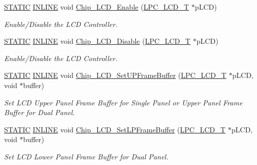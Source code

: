 \begin{DoxyCompactItemize}
\hyperlink{group___l_p_c___types___public___macros_ga10b2d890d871e1489bb02b7e70d9bdfb}{S\+T\+A\+T\+IC} \hyperlink{spifi__18xx__43xx_8h_a2eb6f9e0395b47b8d5e3eeae4fe0c116}{I\+N\+L\+I\+NE} void \hyperlink{group___l_c_d__18_x_x__43_x_x_ga0828ea4978cdb0864d0f6bbfa7dcb49a}{Chip\+\_\+\+L\+C\+D\+\_\+\+Enable} (\hyperlink{struct_l_p_c___l_c_d___t}{L\+P\+C\+\_\+\+L\+C\+D\+\_\+T} $\ast$p\+L\+CD)
\begin{DoxyCompactList}\small\item\em Enable/\+Disable the L\+CD Controller. \end{DoxyCompactList}\item 
\hyperlink{group___l_p_c___types___public___macros_ga10b2d890d871e1489bb02b7e70d9bdfb}{S\+T\+A\+T\+IC} \hyperlink{spifi__18xx__43xx_8h_a2eb6f9e0395b47b8d5e3eeae4fe0c116}{I\+N\+L\+I\+NE} void \hyperlink{group___l_c_d__18_x_x__43_x_x_ga935c17635c088e252344243bc4e83436}{Chip\+\_\+\+L\+C\+D\+\_\+\+Disable} (\hyperlink{struct_l_p_c___l_c_d___t}{L\+P\+C\+\_\+\+L\+C\+D\+\_\+T} $\ast$p\+L\+CD)
\begin{DoxyCompactList}\small\item\em Enable/\+Disable the L\+CD Controller. \end{DoxyCompactList}\item 
\hyperlink{group___l_p_c___types___public___macros_ga10b2d890d871e1489bb02b7e70d9bdfb}{S\+T\+A\+T\+IC} \hyperlink{spifi__18xx__43xx_8h_a2eb6f9e0395b47b8d5e3eeae4fe0c116}{I\+N\+L\+I\+NE} void \hyperlink{group___l_c_d__18_x_x__43_x_x_ga86f17bd80f2c8694226942d7fb44fcfc}{Chip\+\_\+\+L\+C\+D\+\_\+\+Set\+U\+P\+Frame\+Buffer} (\hyperlink{struct_l_p_c___l_c_d___t}{L\+P\+C\+\_\+\+L\+C\+D\+\_\+T} $\ast$p\+L\+CD, void $\ast$buffer)
\begin{DoxyCompactList}\small\item\em Set L\+CD Upper Panel Frame Buffer for Single Panel or Upper Panel Frame Buffer for Dual Panel. \end{DoxyCompactList}\item 
\hyperlink{group___l_p_c___types___public___macros_ga10b2d890d871e1489bb02b7e70d9bdfb}{S\+T\+A\+T\+IC} \hyperlink{spifi__18xx__43xx_8h_a2eb6f9e0395b47b8d5e3eeae4fe0c116}{I\+N\+L\+I\+NE} void \hyperlink{group___l_c_d__18_x_x__43_x_x_ga6e45f8254b1962e58245f769466e9295}{Chip\+\_\+\+L\+C\+D\+\_\+\+Set\+L\+P\+Frame\+Buffer} (\hyperlink{struct_l_p_c___l_c_d___t}{L\+P\+C\+\_\+\+L\+C\+D\+\_\+T} $\ast$p\+L\+CD, void $\ast$buffer)
\begin{DoxyCompactList}\small\item\em Set L\+CD Lower Panel Frame Buffer for Dual Panel. \end{DoxyCompactList}\item 

\end{DoxyCompactItemize}
